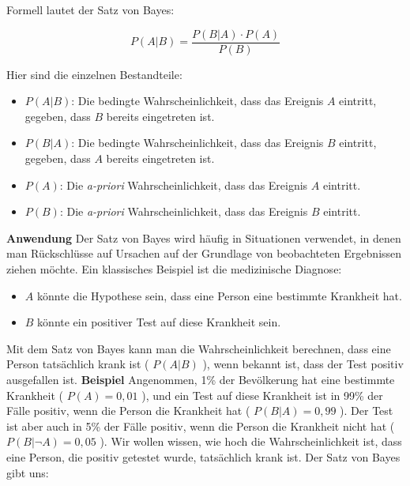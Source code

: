\documentclass[12pt]{article}
\begin{document}
%
Formell lautet der Satz von Bayes:

\[
P(A|B) = \frac{P(B|A) \cdot P(A)}{P(B)}
\]

Hier sind die einzelnen Bestandteile:

\begin{itemize}
    \item \( P(A|B) \): Die bedingte Wahrscheinlichkeit, dass das Ereignis \( A \) eintritt, gegeben, dass \( B \) bereits eingetreten ist.
    \item \( P(B|A) \): Die bedingte Wahrscheinlichkeit, dass das Ereignis \( B \) eintritt, gegeben, dass \( A \) bereits eingetreten ist.
    \item \( P(A) \): Die \textit{a-priori} Wahrscheinlichkeit, dass das Ereignis \( A \) eintritt.
    \item \( P(B) \): Die \textit{a-priori} Wahrscheinlichkeit, dass das Ereignis \( B \) eintritt.
\end{itemize}
%
\textbf{Anwendung}
%
Der Satz von Bayes wird häufig in Situationen verwendet, in denen man Rückschlüsse auf Ursachen auf der Grundlage von beobachteten Ergebnissen ziehen möchte. Ein klassisches Beispiel ist die medizinische Diagnose:

\begin{itemize}
    \item \( A \) könnte die Hypothese sein, dass eine Person eine bestimmte Krankheit hat.
    \item \( B \) könnte ein positiver Test auf diese Krankheit sein.
\end{itemize}
%
Mit dem Satz von Bayes kann man die Wahrscheinlichkeit berechnen, dass eine Person tatsächlich krank ist ( \( P(A|B) \) ), wenn bekannt ist, dass der Test positiv ausgefallen ist.
%
\textbf{Beispiel}
%
Angenommen, 1\% der Bevölkerung hat eine bestimmte Krankheit ( \( P(A) = 0{,}01 \) ), und ein Test auf diese Krankheit ist in 99\% der Fälle positiv, wenn die Person die Krankheit hat ( \( P(B|A) = 0{,}99 \) ). Der Test ist aber auch in 5\% der Fälle positiv, wenn die Person die Krankheit nicht hat ( \( P(B|\neg A) = 0{,}05 \) ). Wir wollen wissen, wie hoch die Wahrscheinlichkeit ist, dass eine Person, die positiv getestet wurde, tatsächlich krank ist.
%
Der Satz von Bayes gibt uns:
\end{document}
